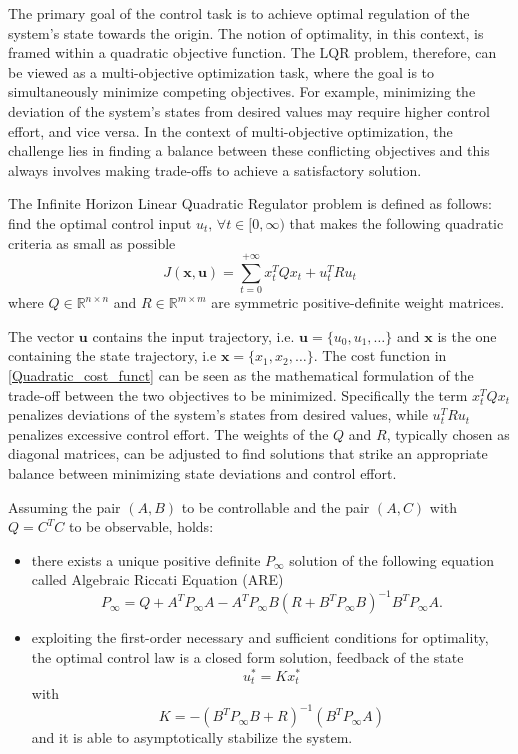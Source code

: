 \documentclass[a4paper,12pt,oneside]{book}
\begin{document}
The primary goal of the control task is to achieve optimal regulation of the system's state towards the origin. 
The notion of optimality, in this context, is framed within a quadratic objective function.
The LQR problem, therefore, can be viewed as a multi-objective optimization task, where the goal is to simultaneously minimize competing objectives.
For example, minimizing the deviation of the system's states from desired values may require higher control effort, and vice versa.
In the context of multi-objective optimization, the challenge lies in finding a balance between these conflicting objectives and this always involves making trade-offs to achieve a satisfactory solution.

\bigskip
The Infinite Horizon Linear Quadratic Regulator problem is defined as follows:
find the optimal control input $u_t, \, \forall t \in [0, \infty)$ that makes the following quadratic criteria as small as possible
\begin{equation}
    J(\boldsymbol{x}, \boldsymbol{u})  = \sum_{t=0} ^{+\infty} x_t^T Q x_t + u_t ^T R u_t
\label{Quadratic_cost_funct}
\end{equation}
where $Q \in \mathbb{R}^{n \times n}$ and $R \in \mathbb{R}^{m \times m}$ are symmetric positive-definite weight matrices.

The vector $\boldsymbol{u}$ contains the input trajectory, i.e. $\boldsymbol{u} = \{u_0, u_1, \dots\}$ and $\boldsymbol{x}$ is the one containing the state trajectory, i.e $\boldsymbol{x} = \{x_1, x_2, \dots\}$.
The cost function in \ref{Quadratic_cost_funct} can be seen as the mathematical formulation of the trade-off between the two objectives to be minimized.
Specifically the term $x_t^T Q x_t$ penalizes deviations of the system's states from desired values, while $u_t^T R u_t$ penalizes excessive control effort.
The weights of the $Q$ and $R$, typically chosen as diagonal matrices, can be adjusted to find solutions that strike an appropriate balance between minimizing state deviations and control effort.


\bigskip
Assuming the pair $(A,B)$ to be controllable and the pair $(A,C)$ with $Q = C^T C$ to be observable, holds:
\begin{itemize}
    \item there exists a unique positive definite $P_\infty$ solution of the following equation called Algebraic Riccati Equation (ARE)
    \begin{equation}
        P_\infty = Q + A^T P_\infty A - A^T P_\infty B (R + B^T P_\infty B)^{-1} B^T P_\infty A.
    \end{equation}
    \item exploiting the first-order necessary and sufficient conditions for optimality, the optimal control law is a closed form solution, feedback of the state
    \begin{equation}
        u_t^* = K x_t^*
    \end{equation}
    with
    \begin{equation}
        K = -( B^T P_\infty B + R)^{-1}(B^T P_\infty A)
    \label{eq:Regulator_LQR}
    \end{equation}
    and it is able to asymptotically stabilize the system.
\end{itemize}
\end{document}
